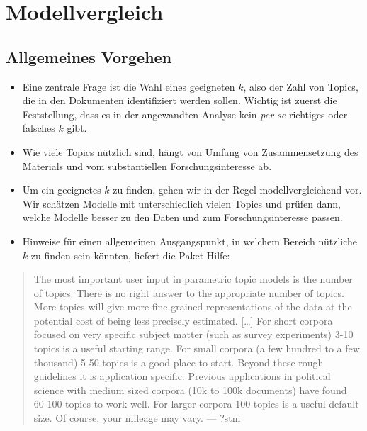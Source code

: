 \documentclass[
]{book}
\providecommand{\tightlist}{%
  \setlength{\itemsep}{0pt}\setlength{\parskip}{0pt}}
\begin{document}
\hypertarget{modellvergleich}{%
\section{Modellvergleich}\label{modellvergleich}}

\hypertarget{allgemeines-vorgehen}{%
\subsection{Allgemeines Vorgehen}\label{allgemeines-vorgehen}}

\begin{itemize}
\tightlist
\item
  Eine zentrale Frage ist die Wahl eines geeigneten \(k\), also der Zahl von Topics, die in den Dokumenten identifiziert werden sollen. Wichtig ist zuerst die Feststellung, dass es in der angewandten Analyse kein \emph{per se} richtiges oder falsches \(k\) gibt.
\item
  Wie viele Topics nützlich sind, hängt von Umfang von Zusammensetzung des Materials und vom substantiellen Forschungsinteresse ab.
\item
  Um ein geeignetes \(k\) zu finden, gehen wir in der Regel modellvergleichend vor. Wir schätzen Modelle mit unterschiedlich vielen Topics und prüfen dann, welche Modelle besser zu den Daten und zum Forschungsinteresse passen.
\item
  Hinweise für einen allgemeinen Ausgangspunkt, in welchem Bereich nützliche \(k\) zu finden sein könnten, liefert die Paket-Hilfe:
\end{itemize}

\begin{quote}
The most important user input in parametric topic models is the number of topics. There is no right answer to the appropriate number of topics. More topics will give more fine-grained representations of the data at the potential cost of being less precisely estimated. {[}\ldots{]} For short corpora focused on very specific subject matter (such as survey experiments) 3-10 topics is a useful starting range. For small corpora (a few hundred to a few thousand) 5-50 topics is a good place to start. Beyond these rough guidelines it is application specific. Previous applications in political science with medium sized corpora (10k to 100k documents) have found 60-100 topics to work well. For larger corpora 100 topics is a useful default size. Of course, your mileage may vary. --- ?stm
\end{quote}
\end{document}
